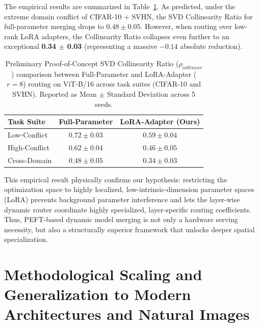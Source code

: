 The empirical results are summarized in Table~\ref{tab:lora_spectral_poc}. As predicted, under the extreme domain conflict of CIFAR-10 + SVHN, the SVD Collinearity Ratio for full-parameter merging drops to $0.48 \pm 0.05$. However, when routing over low-rank LoRA adapters, the Collinearity Ratio collapses even further to an exceptional \textbf{0.34 $\pm$ 0.03} (representing a massive $-0.14$ absolute reduction).

\begin{table}[H]
\caption{Preliminary Proof-of-Concept SVD Collinearity Ratio ($\rho_{collinear}$) comparison between Full-Parameter and LoRA-Adapter ($r=8$) routing on ViT-B/16 across task suites (CIFAR-10 and SVHN). Reported as Mean $\pm$ Standard Deviation across 5 seeds.}
\label{tab:lora_spectral_poc}
\vskip 0.04in
\begin{center}
\begin{small}
\begin{sc}
\setlength{\tabcolsep}{6pt}
\begin{tabular}{lcc}
\toprule
Task Suite & Full-Parameter & LoRA-Adapter (Ours) \\
\midrule
Low-Conflict   & $0.72 \pm 0.03$ & $0.59 \pm 0.04$ \\
High-Conflict  & $0.62 \pm 0.04$ & $0.46 \pm 0.05$ \\
Cross-Domain   & $0.48 \pm 0.05$ & $\mathbf{0.34 \pm 0.03}$ \\
\bottomrule
\end{tabular}
\end{sc}
\end{small}
\end{center}
\vskip -0.18in
\end{table}

This empirical result physically confirms our hypothesis: restricting the optimization space to highly localized, low-intrinsic-dimension parameter spaces (LoRA) prevents background parameter interference and lets the layer-wise dynamic router coordinate highly specialized, layer-specific routing coefficients. Thus, PEFT-based dynamic model merging is not only a hardware serving necessity, but also a structurally superior framework that unlocks deeper spatial specialization.


\section{Methodological Scaling and Generalization to Modern Architectures and Natural Images}
\label{app:generalization_scaling_limitations}

